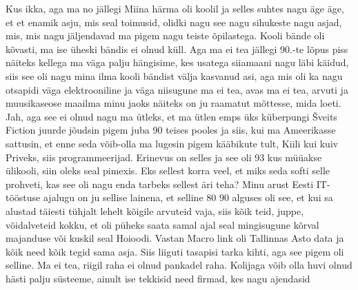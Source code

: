 Kus ikka, aga ma no jällegi Miina härma oli koolil ja selles suhtes nagu äge äge, et et enamik asju, mis seal toimusid, olidki nagu see nagu sihukeste nagu asjad, mis, mis nagu jäljendavad ma pigem nagu teiste õpilastega. Kooli bände oli kõvasti, ma ise üheski bändis ei olnud küll. Aga ma ei tea jällegi 90.-te lõpus piss näiteks kellega ma väga palju hängisime, kes usatega siiamaani nagu läbi käidud, siis see oli nagu mina ilma kooli bändist välja kasvanud asi, aga mis oli ka nagu otsapidi väga elektrooniline ja väga niisugune ma ei tea, avas ma ei tea, arvuti ja muusikaseose maailma minu jaoks näiteks on ju raamatut mõttesse, mida loeti. Jah, aga see ei olnud nagu ma ütleks, et ma ütlen emps üks küberpungi Šveits Fiction juurde jõudsin pigem juba 90 teises pooles ja siis, kui ma Ameerikasse sattusin, et enne seda võib-olla ma lugesin pigem kääbikute tult, Kiili kui kuiv Priveks, siis programmeerijad. Erinevus on selles ja see oli 93 kus müüakse ülikooli, siin oleks seal pimexis. Eks sellest korra veel, et miks seda softi selle prohveti, kas see oli nagu enda tarbeks sellest äri teha? Minu arust Eesti IT-tööstuse ajalugu on ju sellise lainena, et selline 80 90 alguses oli see, et kui sa alustad täiesti tühjalt lehelt kõigile arvuteid vaja, siis kõik teid, juppe, võidalveteid kokku, et oli püheks saata samal ajal seal mingisugune kõrval majanduse või kuskil seal Hoioodi. Vastan Macro link oli Tallinnas Asto data ja kõik need kõik tegid sama asja. Siis liiguti tasapisi tarka kihti, aga see pigem oli selline. Ma ei tea, riigil raha ei olnud pankadel raha. Kolijaga võib olla huvi olnud hästi palju süsteeme, ainult ise tekkisid need firmad, kes nagu ajendasid
